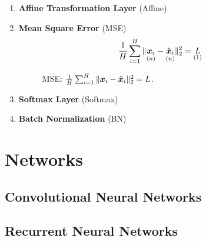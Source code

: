 \documentclass[9pt,twocolumn,times]{article}
\begin{document}
\begin{enumerate}[leftmargin=*]
\item \textbf{Affine Transformation Layer} (Affine)

\item \textbf{Mean Square Error} (MSE)
\begin{equation}
	\frac{1}{H} \sum_{i=1}^H
	\|\underset{(n)}{{\bm{x}}_i} - \underset{(n)}{\hat{{\bm{x}}}_i} \|_2^2
	= \underset{(1)}{L} 
\end{equation}
\begin{figure}[h]
	\centering
	\resizebox{0.618\columnwidth}{!}{%
		
	}
	\caption{MSE: $\frac{1}{H} \sum_{i=1}^H \|{\bm{x}}_i - \hat{{\bm{x}}}_i\|_2^2 = L$.}
\end{figure}

\item \textbf{Softmax Layer} (Softmax)

\item \textbf{Batch Normalization} (BN)
\end{enumerate}

\section{Networks}

\subsection{Convolutional Neural Networks}

\subsection{Recurrent Neural Networks}
\end{document}
